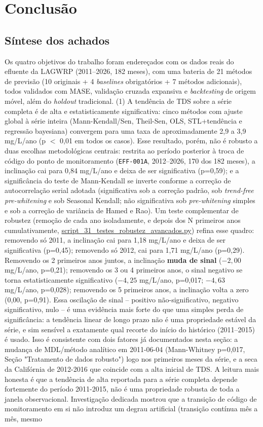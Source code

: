 \section{Conclusão}

\subsection{Síntese dos achados}

Os quatro objetivos do trabalho foram endereçados com os dados reais do efluente da LAGWRP (2011--2026, 182 meses), com uma bateria de 21 métodos de previsão (10 originais + 4 \textit{baselines} obrigatórios + 7 métodos adicionais), todos validados com MASE, validação cruzada expansiva e \textit{backtesting} de origem móvel, além do \textit{holdout} tradicional. (1) A tendência de TDS sobre a série completa é de alta e estatisticamente significativa: cinco métodos com ajuste global à série inteira (Mann-Kendall/Sen, Theil-Sen, OLS, STL+tendência e regressão bayesiana) convergem para uma taxa de aproximadamente 2,9 a 3,9 mg/L/ano (p $<$ 0,01 em todos os casos). Esse resultado, porém, não é robusto a duas escolhas metodológicas centrais: restrita ao período posterior à troca de código do ponto de monitoramento (\texttt{EFF-001A}, 2012--2026, 170 dos 182 meses), a inclinação cai para 0,84 mg/L/ano e deixa de ser significativa (p=0,59); e a significância do teste de Mann-Kendall se inverte conforme a correção de autocorrelação serial adotada (significativa sob a correção padrão, sob \textit{trend-free pre-whitening} e sob Seasonal Kendall; não significativa sob \textit{pre-whitening} simples e sob a correção de variância de Hamed e Rao). Um teste complementar de robustez (remoção de cada ano isoladamente, e depois dos N primeiros anos cumulativamente, \url{script_31_testes_robustez_avancados.py}) refina esse quadro: removendo só 2011, a inclinação cai para 1,18 mg/L/ano e deixa de ser significativa (p=0,45); removendo só 2012, cai para 1,71 mg/L/ano (p=0,29). Removendo os 2 primeiros anos juntos, a inclinação \textbf{muda de sinal} ($-2{,}00$ mg/L/ano, p=0,21); removendo os 3 ou 4 primeiros anos, o sinal negativo se torna estatisticamente significativo ($-4{,}25$ mg/L/ano, p=0,017; $-4{,}63$ mg/L/ano, p=0,028); removendo os 5 primeiros anos, a inclinação volta a zero (0,00, p=0,91). Essa oscilação de sinal -- positivo não-significativo, negativo significativo, nulo -- é uma evidência mais forte do que uma simples perda de significância: a tendência linear de longo prazo não é uma propriedade estável da série, e sim sensível a exatamente qual recorte do início do histórico (2011--2015) é usado. Isso é consistente com dois fatores já documentados nesta seção: a mudança de MDL/método analítico em 2011-06-04 (Mann-Whitney p=0,017, Seção "Tratamento de dados robusto") logo nos primeiros meses da série, e a seca da Califórnia de 2012-2016 que coincide com a alta inicial de TDS. A leitura mais honesta é que a tendência de alta reportada para a série completa depende fortemente do período 2011-2015, não é uma propriedade robusta de toda a janela observacional. Investigação dedicada mostrou que a transição de código de monitoramento em si não introduz um degrau artificial (transição contínua mês a mês, mesmo 